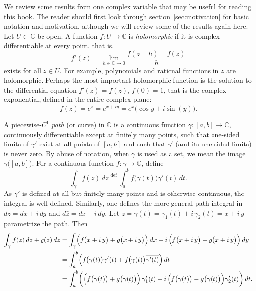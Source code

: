 \documentclass[12pt,openany]{book}
\newcommand{\C}{{\mathbb{C}}}
\theoremstyle{plain}
\theoremstyle{remark}
\theoremstyle{definition}
\theoremstyle{exercise}
\theoremstyle{example}
\newcommand{\sectionref}[1]{\hyperref[#1]{section~\ref*{#1}}}
\begin{document}
We review some results from one complex variable that may be useful for
reading this book.
The reader should first look through \sectionref{sec:motivation}
for basic notation and motivation, although we will review some of the
results again here.
Let $U \subset \C$ be open.
A function
$f \colon U \to \C$ is \emph{holomorphic} if it is complex
differentiable at every point, that is,
\begin{equation*}
f'(z) = \lim_{h \in \C \to 0} \frac{f(z+h) - f(z)}{h}
\end{equation*}
exists for all $z \in U$.  For example, polynomials and rational
functions in $z$ are holomorphic.  Perhaps the most important holomorphic
function is the solution to the differential equation $f'(z) = f(z)$, $f(0) = 1$, that is
the complex exponential, defined in the entire complex plane:
\begin{equation*}
f(z) = e^z = e^{x+iy} = e^x \bigl( \cos y + i \sin(y) \bigr) .
\end{equation*}


A piecewise-$C^1$ \emph{path} (or curve) in $\C$
is a continuous function $\gamma \colon [a,b] \to \C$,
continuously differentiable except at finitely many points,
such that one-sided limits of $\gamma'$ exist at all points of $[a,b]$
and such that $\gamma'$ (and its one sided limits) is never zero.
By abuse of notation, when $\gamma$ is used as a set, we mean
the image
$\gamma\bigl([a,b]\bigr)$.
For a continuous function $f \colon \gamma \to \C$, define
%
\begin{equation*}
\int_\gamma f(z) \, dz 
\overset{\text{def}}{=}
\int_a^b f\bigl(\gamma(t)\bigr) \gamma'(t) \, dt .
\end{equation*}
As $\gamma'$ is defined at all but finitely many points and is otherwise
continuous, the integral is well-defined.  Similarly, one defines the more general
path integral in $dz = dx + i\,dy$ and $d\bar{z} = dx - i\, dy$.
Let
$z = \gamma(t) = \gamma_1(t) + i \, \gamma_2(t) = x + i\, y$
parametrize the path.  Then
\begin{equation*}
\begin{split}
\int_\gamma f(z) \, dz + g(z) \, d\bar{z}
& =
\int_\gamma
\Bigl(f\bigl(x+i\, y\bigr) + g\bigl(x+i\, y\bigr) \Bigr) \, dx
+
i \, \Bigl( f\bigl(x+i\, y\bigr) - g\bigl(x+i\, y\bigr) \Bigr) \, dy
\\
& =
\int_a^b
\Bigl(
f\bigl(\gamma(t)\bigr) \gamma'(t)
+
f\bigl(\gamma(t)\bigr) \overline{\gamma'(t)}
\Bigr) \, dt
\\
& =
\int_a^b
\biggl(
\Bigl(f\bigl(\gamma(t)\bigr) + g\bigl(\gamma(t)\bigr) \Bigr) \,
\gamma_1'(t)
+
i \, \Bigl( f\bigl(\gamma(t)\bigr) - g\bigl(\gamma(t)\bigr) \Bigr)
\gamma_2'(t)
\biggr)
\, dt .
\end{split}
\end{equation*}
\end{document}
